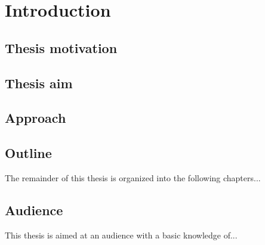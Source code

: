 \chapter{Introduction}

\section{Thesis motivation}

\section{Thesis aim}

\section{Approach}

\section{Outline}
The remainder of this thesis is organized into the following chapters...

\section{Audience}
This thesis is aimed at an audience with a basic knowledge of...
